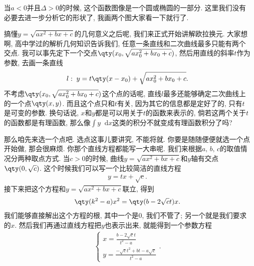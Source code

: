 \documentclass{ctexbook}
\newcommand*{\dif}{\mathop{}\!\mathrm{d}}
\begin{document}
{当$a<0$并且$\Delta>0$的时候, 这个函数图像是一个圆或椭圆的一部分. 这里我们没有必要去进一步分析它的形状了, 我画两个图大家看一下就行了. 
\begin{center}
\end{center}\par
搞懂$y=\sqrt{ax^{2}+bx+c}$的几何意义之后呢, 我们来正式开始讲解欧拉换元. 大家想啊, 高中学过的解析几何知识告诉我们, 任意一条直线和二次曲线最多只能有两个交点. 我可以事先定下一个交点$\qty(x_{0},\sqrt{ax_{0}^{2}+bx_{0}+c})$, 然后用直线的斜率$t$作为参数, 去画一条直线
\begin{align*}
l:\;y=t\qty(x-x_{0})+\sqrt{ax_{0}^{2}+bx_{0}+c}
.\end{align*}
不考虑$\qty(x_{0},\sqrt{ax_{0}^{2}+bx_{0}+c})$这个点的话呢, 直线$l$最多还能够确定二次曲线上的一个点$\qty(x,y)$. 而且这个点只和$t$有关, 因为其它的信息都是定好了的, 只有$t$是可变的参数. 换句话说, $x$和$y$都是可以用关于$t$的函数来表示的, 倘若这两个关于$t$的函数都是有理函数, 那么像$\int y\dif{x}$这类的积分不就变成有理函数积分了吗? \par
那么咱先来选一个点吧. 选点这事儿要讲究, 不能将就. 你要是随随便便就选一个点开始做, 那会很麻烦. 你那个直线方程都能写一大串呢. 我们来根据$a,\,b,\,c$的取值情况分两种取点方式. 
当$c>0$的时候, 曲线$y=\sqrt{ax^{2}+bx+c}$和$y$轴有交点$\qty(0,\sqrt{c})$. 这个时候我们可以写一个比较简洁的直线方程
\begin{align*}
y=tx+\sqrt{c}
.\end{align*}
接下来把这个方程和$y=\sqrt{ax^{2}+bx+c}$联立, 得到
\begin{align*}
\qty(k^{2}-a)x^{2}=\qty(b-2\sqrt{c}t)x
.\end{align*}
我们能够直接解出这个方程的根, 其中一个是$0$, 我们不管了; 另一个就是我们要求的$x$. 然后我们再通过直线方程把$y$也表示出来, 就能得到一个参数方程
\begin{align*}
\begin{cases}
x=\frac{b-2\sqrt{c}t}{t^{2}-a}\\
y=\frac{-\sqrt{c}t^{2}+bt-a\sqrt{c}}{t^{2}-a}
\end{cases}
.\end{align*}
}
\end{document}
